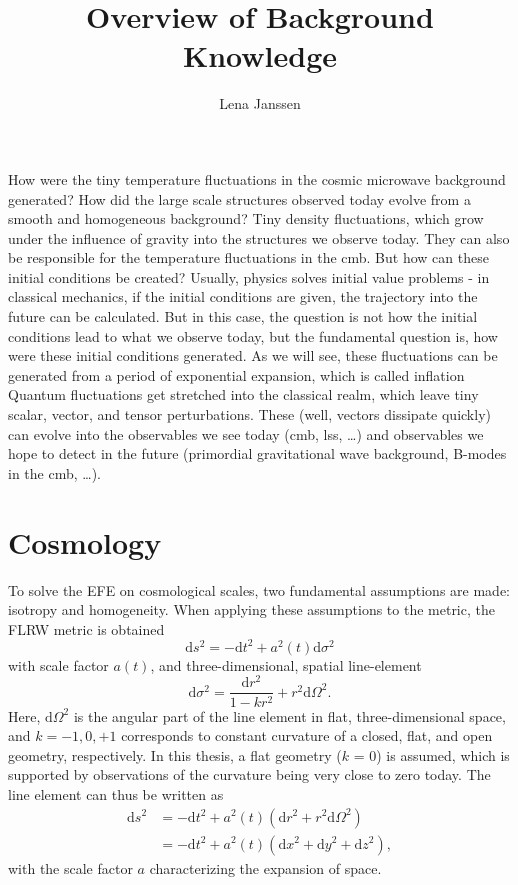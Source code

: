 \documentclass[12pt]{article}
\title{Overview of Background Knowledge}
\author{Lena Janssen}
\date{}
\newcommand*\Diff[1]{\mathrm{d}}
\newcommand{\pr}[1]{\left(#1\right)}
\begin{document}
\maketitle

How were the tiny temperature fluctuations in the cosmic microwave background generated? How did the large scale structures observed today evolve from a smooth and homogeneous background? Tiny density fluctuations, which grow under the influence of gravity into the structures we observe today. They can also be responsible for the temperature fluctuations in the cmb. But how can these initial conditions be created? Usually, physics solves initial value problems - in classical mechanics, if the initial conditions are given, the trajectory into the future can be calculated. But in this case, the question is not how the initial conditions lead to what we observe today, but the fundamental question is, how were these initial conditions generated. As we will see, these fluctuations can be generated from a period of exponential expansion, which is called inflation Quantum fluctuations get stretched into the classical realm, which leave tiny scalar, vector, and tensor perturbations. These (well, vectors dissipate quickly) can evolve into the observables we see today (cmb, lss, \dots) and observables we hope to detect in the future (primordial gravitational wave background, B-modes in the cmb, \dots). 
\hypersetup{linkcolor=black}
\tableofcontents

\section{Cosmology}
To solve the EFE on cosmological scales, two fundamental assumptions are made: isotropy and homogeneity. When applying these assumptions to the metric, the FLRW metric is obtained 
\begin{equation}
    \Diff) s^2 = - \Diff) t^2 + a^2\pr{t} \Diff) \sigma^2
\end{equation}
with scale factor $a\pr{t}$, and three-dimensional, spatial line-element 
\begin{equation}
    \Diff) \sigma^2 = \frac{\Diff) r^2}{1 - kr^2} + r^2 \Diff) \Omega^2.
\end{equation}
Here, $\Diff) \Omega^2$ is the angular part of the line element in flat, three-dimensional space, and $k = -1, 0, +1$ corresponds to constant curvature of a closed, flat, and open geometry, respectively. In this thesis, a flat geometry ($k$ = 0) is assumed, which is supported by observations of the curvature being very close to zero today. The line element can thus be written as
\begin{align}
    \Diff) s^2 &= - \Diff) t^2 + a^2\pr{t} \pr{\Diff) r^2 + r^2 \Diff) \Omega^2}\\
    &= - \Diff) t^2 + a^2\pr{t} \pr{\Diff)x^2 + \Diff)y^2 + \Diff)z^2},
\end{align}
with the scale factor $a$ characterizing the expansion of space.
\end{document}
